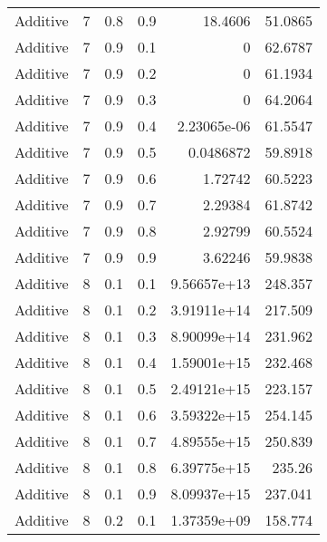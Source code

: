 \documentclass{article}
\begin{document}
\begin{longtable}[H]{lrrrrr}
 Additive       &       7 &   0.8 &            0.9 &     18.4606      &         51.0865 \\
 Additive       &       7 &   0.9 &            0.1 &      0           &         62.6787 \\
 Additive       &       7 &   0.9 &            0.2 &      0           &         61.1934 \\
 Additive       &       7 &   0.9 &            0.3 &      0           &         64.2064 \\
 Additive       &       7 &   0.9 &            0.4 &      2.23065e-06 &         61.5547 \\
 Additive       &       7 &   0.9 &            0.5 &      0.0486872   &         59.8918 \\
 Additive       &       7 &   0.9 &            0.6 &      1.72742     &         60.5223 \\
 Additive       &       7 &   0.9 &            0.7 &      2.29384     &         61.8742 \\
 Additive       &       7 &   0.9 &            0.8 &      2.92799     &         60.5524 \\
 Additive       &       7 &   0.9 &            0.9 &      3.62246     &         59.9838 \\
 Additive       &       8 &   0.1 &            0.1 &      9.56657e+13 &        248.357  \\
 Additive       &       8 &   0.1 &            0.2 &      3.91911e+14 &        217.509  \\
 Additive       &       8 &   0.1 &            0.3 &      8.90099e+14 &        231.962  \\
 Additive       &       8 &   0.1 &            0.4 &      1.59001e+15 &        232.468  \\
 Additive       &       8 &   0.1 &            0.5 &      2.49121e+15 &        223.157  \\
 Additive       &       8 &   0.1 &            0.6 &      3.59322e+15 &        254.145  \\
 Additive       &       8 &   0.1 &            0.7 &      4.89555e+15 &        250.839  \\
 Additive       &       8 &   0.1 &            0.8 &      6.39775e+15 &        235.26   \\
 Additive       &       8 &   0.1 &            0.9 &      8.09937e+15 &        237.041  \\
 Additive       &       8 &   0.2 &            0.1 &      1.37359e+09 &        158.774  \\

\end{longtable}
\end{document}
